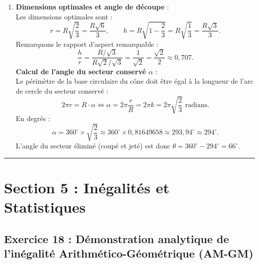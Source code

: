 \documentclass[11pt,a4paper]{article}
\begin{document}
\begin{correctionbox}
\begin{enumerate}[label=\textbf{\arabic*.}]
    \item \textbf{Dimensions optimales et angle de découpe} :\\
    Les dimensions optimales sont :
    \[
    r = R \sqrt{\frac{2}{3}} = \frac{R\sqrt{6}}{3}, \qquad h = R \sqrt{1 - \frac{2}{3}} = R \sqrt{\frac{1}{3}} = \frac{R\sqrt{3}}{3}.
    \]
    Remarquons le rapport d'aspect remarquable :
    \[
    \frac{h}{r} = \frac{R/\sqrt{3}}{R\sqrt{2}/\sqrt{3}} = \frac{1}{\sqrt{2}} = \frac{\sqrt{2}}{2} \approx 0{,}707.
    \]
    \textbf{Calcul de l'angle du secteur conservé $\alpha$} :\\
    Le périmètre de la base circulaire du cône doit être égal à la longueur de l'arc de cercle du secteur conservé :
    \[
    2\pi r = R \cdot \alpha \iff \alpha = 2\pi \frac{r}{R} = 2\pi k = 2\pi \sqrt{\frac{2}{3}}\text{ radians}.
    \]
    En degrés :
    \[
    \alpha = 360^\circ \times \sqrt{\frac{2}{3}} \approx 360^\circ \times 0{,}81649658 \approx 293{,}94^\circ \approx 294^\circ.
    \]
    L'angle du secteur éliminé (coupé et jeté) est donc $\theta = 360^\circ - 294^\circ = 66^\circ$.
\end{enumerate}
\end{correctionbox}


\vspace{1cm}
\hrule
\vspace{1cm}
\section{Section 5 : Inégalités et Statistiques}

\subsection*{Exercice 18 : Démonstration analytique de l'inégalité Arithmético-Géométrique (AM-GM)}
\end{document}
